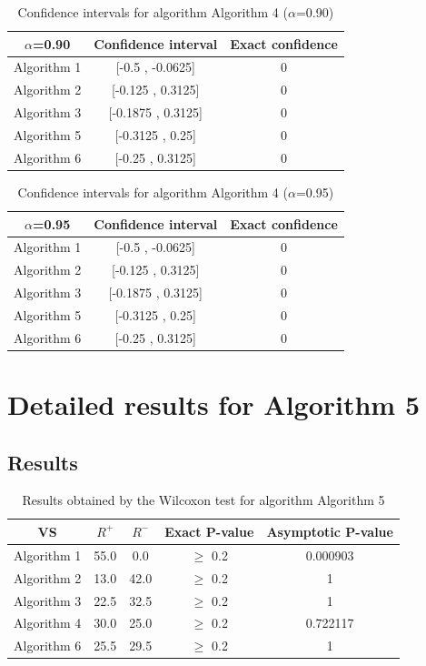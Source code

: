 \documentclass[a4paper,10pt]{article}
\begin{document}
\begin{table}[!htp]
\centering\small
\begin{tabular}{
|c|c|c|}
\hline
 $\alpha$=0.90 & Confidence interval & Exact confidence \\ \hline 
Algorithm 1 & [-0.5 , -0.0625] & 0\\ \hline 
Algorithm 2 & [-0.125 , 0.3125] & 0\\ \hline 
Algorithm 3 & [-0.1875 , 0.3125] & 0\\ \hline 
Algorithm 5 & [-0.3125 , 0.25] & 0\\ \hline 
Algorithm 6 & [-0.25 , 0.3125] & 0\\ \hline 

\end{tabular}
\caption{Confidence intervals for algorithm Algorithm 4 ($\alpha$=0.90)}
\end{table}
\begin{table}[!htp]
\centering\small
\begin{tabular}{
|c|c|c|}
\hline
 $\alpha$=0.95 & Confidence interval & Exact confidence \\ \hline 
Algorithm 1 & [-0.5 , -0.0625] & 0\\ \hline 
Algorithm 2 & [-0.125 , 0.3125] & 0\\ \hline 
Algorithm 3 & [-0.1875 , 0.3125] & 0\\ \hline 
Algorithm 5 & [-0.3125 , 0.25] & 0\\ \hline 
Algorithm 6 & [-0.25 , 0.3125] & 0\\ \hline 

\end{tabular}
\caption{Confidence intervals for algorithm Algorithm 4 ($\alpha$=0.95)}
\end{table}

 \clearpage 


\section{Detailed results for Algorithm 5}


\subsection{Results}

\begin{table}[!htp]
\centering\small
\begin{tabular}{
|c|c|c|c|c|}
\hline
 VS & $R^{+}$ & $R^{-}$ & Exact P-value & Asymptotic P-value \\ \hline 
Algorithm 1 & 55.0 & 0.0 & $\geq$ 0.2 & 0.000903\\ \hline 
Algorithm 2 & 13.0 & 42.0 & $\geq$ 0.2 & 1\\ \hline 
Algorithm 3 & 22.5 & 32.5 & $\geq$ 0.2 & 1\\ \hline 
Algorithm 4 & 30.0 & 25.0 & $\geq$ 0.2 & 0.722117\\ \hline 
Algorithm 6 & 25.5 & 29.5 & $\geq$ 0.2 & 1\\ \hline 

\end{tabular}
\caption{Results obtained by the Wilcoxon test for algorithm Algorithm 5}
\end{table}
\end{document}
